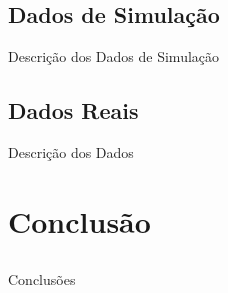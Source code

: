 \documentclass{beamer}
\begin{document}
\subsection{Dados de Simulação}

\begin{frame}{Descrição dos Dados de Simulação}
    
\end{frame}


\subsection{Dados Reais}

\begin{frame}{Descrição dos Dados}
    
\end{frame}

\section{Conclusão}
\subsection{}

\begin{frame}{Conclusões}
    
\end{frame}
\end{document}
